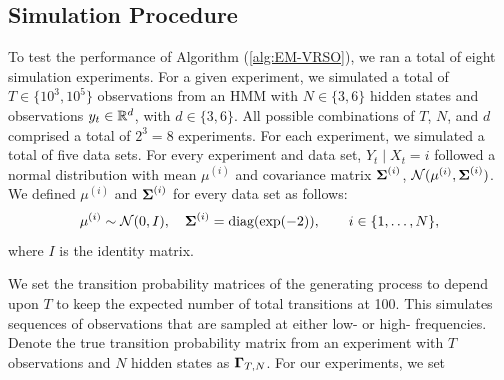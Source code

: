 
\subsection{Simulation Procedure}

To test the performance of Algorithm (\ref{alg:EM-VRSO}), we ran a total of eight simulation experiments. For a given experiment, we simulated a total of $T \in \{10^3,10^5\}$ observations from an HMM with $N \in \{3,6\}$ hidden states and observations $y_t \in \mathbb{R}^d$, with $d \in \{3,6\}$. All possible combinations of $T$, $N$, and $d$ comprised a total of $2^3 = 8$ experiments. For each experiment, we simulated a total of five data sets. For every experiment and data set, $Y_t \mid X_t = i$ followed a normal distribution with mean $\mu^{(i)}$ and covariance matrix $\boldsymbol{\Sigma}^{(i)}$, $\mathcal{N}(\mu^{(i)},\boldsymbol{\Sigma}^{(i)})$. We defined $\mu^{(i)}$ and $\boldsymbol{\Sigma}^{(i)}$ for every data set as follows:
%
\begin{equation}
    \mu^{(i)} \sim \mathcal{N}(0,I), \quad \boldsymbol{\Sigma}^{(i)} = \text{diag}(\exp(-2)), \qquad i \in \{1,\ldots,N\},
\end{equation}
%
where $I$ is the identity matrix.

We set the transition probability matrices of the generating process to depend upon $T$ to keep the expected number of total transitions at 100. This simulates sequences of observations that are sampled at either low- or high- frequencies.
%
Denote the true transition probability matrix from an experiment with $T$ observations and $N$ hidden states as $\boldsymbol{\Gamma}_{T,N}$. For our experiments, we set

